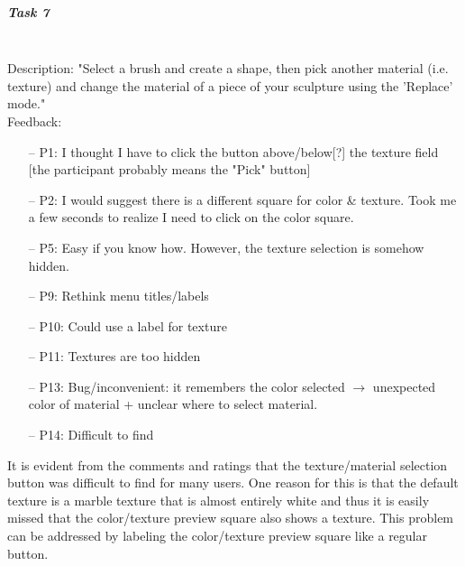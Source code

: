 \subparagraph{Task 7} \hfill \\
Description: "Select a brush and create a shape, then pick another material (i.e. texture) and change the material of a piece of your sculpture using the 'Replace' mode."\\
Feedback:
\begin{enumerate} \setlength\itemsep{-0.5em}
	\item[--] P1: I thought I have to click the button above/below[?] the texture field [the participant probably means the "Pick" button]
	\item[--] P2: I would suggest there is a different square for color \& texture. Took me a few seconds to realize I need to click on the color square.
	\item[--] P5: Easy if you know how. However, the texture selection is somehow hidden.
	\item[--] P9: Rethink menu titles/labels
	\item[--] P10: Could use a label for texture
	\item[--] P11: Textures are too hidden
	\item[--] P13: Bug/inconvenient: it remembers the color selected $\rightarrow$ unexpected color of material + unclear where to select material.
	\item[--] P14: Difficult to find
\end{enumerate}
It is evident from the comments and ratings that the texture/material selection button was difficult to find for many users. One reason for this is that the default texture is a marble texture that is almost entirely white and thus it is easily missed that the color/texture preview square also shows a texture. This problem can be addressed by labeling the color/texture preview square like a regular button.

